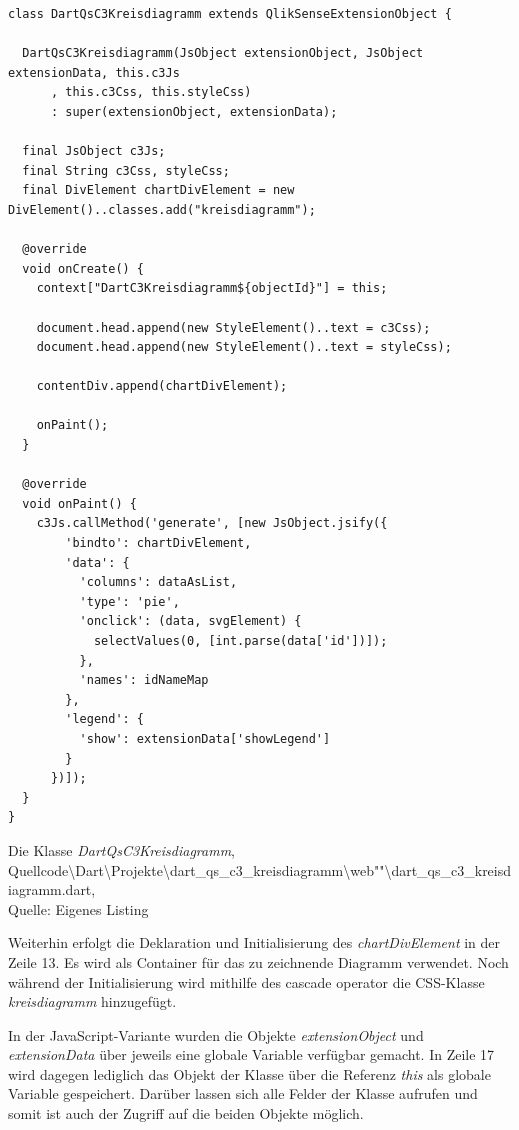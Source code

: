\begin{listing}[htbp]
\begin{verbatim}
class DartQsC3Kreisdiagramm extends QlikSenseExtensionObject {

  DartQsC3Kreisdiagramm(JsObject extensionObject, JsObject extensionData, this.c3Js
      , this.c3Css, this.styleCss)
      : super(extensionObject, extensionData);

  final JsObject c3Js;
  final String c3Css, styleCss;
  final DivElement chartDivElement = new DivElement()..classes.add("kreisdiagramm");

  @override
  void onCreate() {
    context["DartC3Kreisdiagramm${objectId}"] = this;

    document.head.append(new StyleElement()..text = c3Css);
    document.head.append(new StyleElement()..text = styleCss);

    contentDiv.append(chartDivElement);

    onPaint();
  }

  @override
  void onPaint() {
    c3Js.callMethod('generate', [new JsObject.jsify({
        'bindto': chartDivElement,
        'data': {
          'columns': dataAsList,
          'type': 'pie',
          'onclick': (data, svgElement) {
            selectValues(0, [int.parse(data['id'])]);
          },
          'names': idNameMap
        },
        'legend': {
          'show': extensionData['showLegend']
        }
      })]);
  }
}
\end{verbatim}
\caption[Die Klasse \textit{DartQsC3Kreisdiagramm}]{Die Klasse \textit{DartQsC3Kreisdiagramm}, \\Quellcode\textbackslash{}Dart\textbackslash{}Projekte\textbackslash{}dart\_qs\_c3\_kreisdiagramm\textbackslash{}web""\textbackslash{}dart\_qs\_c3\_kreisdiagramm.dart, \\Quelle: Eigenes Listing}
\label{lst:DartQsC3KreisdiagrammDartQsC3KreisdiagrammDart}
\end{listing}

Weiterhin erfolgt die Deklaration und Initialisierung des \textit{chartDivElement} in der Zeile 13. Es wird als Container für das zu zeichnende Diagramm verwendet. Noch während der Initialisierung wird mithilfe des cascade operator die CSS-Klasse \textit{kreisdiagramm} hinzugefügt. 

In der JavaScript-Variante wurden die Objekte \textit{extensionObject} und \textit{extensionData} über jeweils eine globale Variable verfügbar gemacht. In Zeile 17 wird dagegen lediglich das Objekt der Klasse über die Referenz \textit{this} als globale Variable gespeichert. Darüber lassen sich alle Felder der Klasse aufrufen und somit ist auch der Zugriff auf die beiden Objekte möglich.

